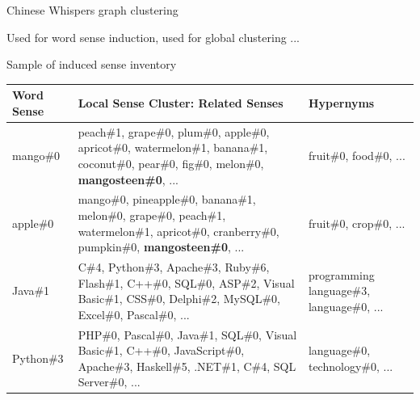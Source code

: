 \documentclass[usenames,dvipsnames]{beamer}
\begin{document}
\begin{frame}{Chinese Whispers graph clustering}

Used for word sense induction, used for global clustering ... 

\end{frame}

	
\begin{frame}{Sample of induced sense inventory}


\begin{table}
\centering
\scriptsize
\begin{tabular}{l|p{6cm}|p{2.5cm}} 
\bf Word Sense & \bf Local Sense Cluster: Related Senses & \bf Hypernyms \\
\toprule
 mango\#0 &  peach\#1, grape\#0, plum\#0, apple\#0, apricot\#0, watermelon\#1, banana\#1, coconut\#0, pear\#0, fig\#0, melon\#0,  \textbf{mangosteen\#0}, ... & fruit\#0, food\#0, ... \\
 
\midrule
apple\#0 & mango\#0, pineapple\#0, banana\#1, melon\#0, grape\#0, peach\#1, watermelon\#1, apricot\#0, cranberry\#0, pumpkin\#0, \textbf{mangosteen\#0}, ... & fruit\#0, crop\#0,  ... \\

\midrule
Java\#1 & C\#4, Python\#3, Apache\#3, Ruby\#6, Flash\#1, C++\#0, SQL\#0, ASP\#2, Visual Basic\#1, CSS\#0, Delphi\#2, MySQL\#0, Excel\#0, Pascal\#0, ... & programming language\#3, language\#0, ... \\

\midrule
Python\#3 & PHP\#0, Pascal\#0, Java\#1, SQL\#0, Visual Basic\#1, C++\#0, JavaScript\#0, Apache\#3, Haskell\#5, .NET\#1, C\#4, SQL Server\#0, ... & language\#0, technology\#0, ... \\

\end{tabular}


\end{table}



\end{frame}
\end{document}
